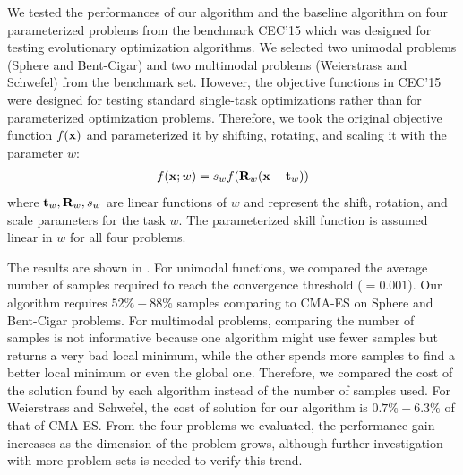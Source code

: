 We tested the performances of our algorithm and the baseline algorithm on four
parameterized problems from the benchmark CEC'15 \cite{Chen:2015:CEC} which was
designed for testing evolutionary optimization algorithms.  
We selected two unimodal problems (Sphere and Bent-Cigar) and two multimodal
problems (Weierstrass and Schwefel) from the benchmark set. 
However, the objective functions in CEC'15 were designed for testing
standard single-task optimizations rather than for parameterized
optimization problems. Therefore, we took the original objective function $f(\mathbf{x})$
and parameterized it by shifting, rotating, and scaling it with the
parameter $w$:
\begin{equation}
  \begin{aligned}
    f(\mathbf{x}; w) = s_w f(\mathbf{R}_w(\mathbf{x}-\mathbf{t}_w))
  \end{aligned}
\end{equation} 
where $\mathbf{t}_w, \mathbf{R}_w, s_w$ are linear functions of $w$ and
represent the shift, rotation, and scale parameters for the task
$w$. The parameterized skill function is assumed linear in $w$ for all four problems. 

The results are shown in .  For unimodal
functions, we compared the average number of samples required to reach
the convergence threshold ($=0.001$). Our algorithm requires $52\% -88\%$ samples comparing
  to CMA-ES on Sphere and Bent-Cigar problems.
For multimodal problems, comparing the number of samples is not
informative because one algorithm might use fewer samples but returns a
very bad local minimum, while the other spends more samples to find a
better local minimum or even the global one. Therefore, we compared
the cost of the solution found by each algorithm instead of the number
of samples used. For Weierstrass and Schwefel, the cost of solution
for our algorithm is $0.7\%-6.3\%$ of that of CMA-ES.
From the four problems we evaluated, the performance gain increases as
the dimension of the problem grows, although further investigation with
more problem sets is needed to verify this trend.


